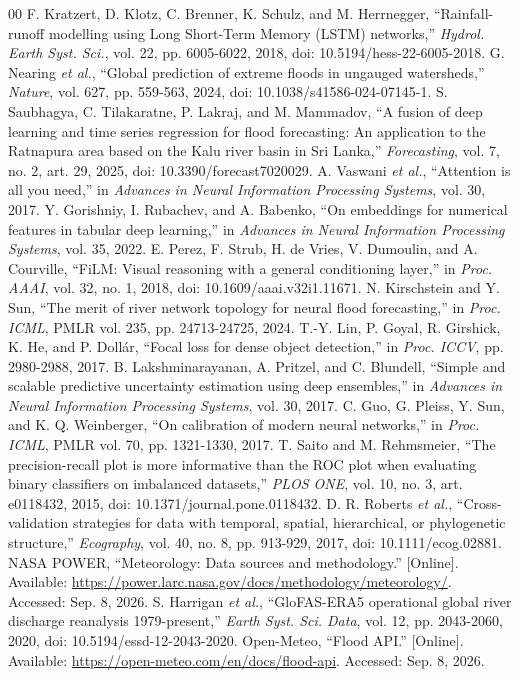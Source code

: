 \documentclass[conference]{IEEEtran}
\begin{document}
\balance
\begin{thebibliography}{00}
 F. Kratzert, D. Klotz, C. Brenner, K. Schulz, and
M. Herrnegger, ``Rainfall-runoff modelling using Long Short-Term Memory (LSTM)
networks,'' \emph{Hydrol. Earth Syst. Sci.}, vol. 22, pp. 6005-6022, 2018,
doi: 10.5194/hess-22-6005-2018.
 G. Nearing \emph{et al.}, ``Global prediction of extreme
floods in ungauged watersheds,'' \emph{Nature}, vol. 627, pp. 559-563, 2024,
doi: 10.1038/s41586-024-07145-1.
 S. Saubhagya, C. Tilakaratne, P. Lakraj, and
M. Mammadov, ``A fusion of deep learning and time series regression for flood
forecasting: An application to the Ratnapura area based on the Kalu river basin
in Sri Lanka,'' \emph{Forecasting}, vol. 7, no. 2, art. 29, 2025,
doi: 10.3390/forecast7020029.
 A. Vaswani \emph{et al.}, ``Attention is all you need,''
in \emph{Advances in Neural Information Processing Systems}, vol. 30, 2017.
 Y. Gorishniy, I. Rubachev, and A. Babenko, ``On
embeddings for numerical features in tabular deep learning,'' in
\emph{Advances in Neural Information Processing Systems}, vol. 35, 2022.
 E. Perez, F. Strub, H. de Vries, V. Dumoulin, and
A. Courville, ``FiLM: Visual reasoning with a general conditioning layer,''
in \emph{Proc. AAAI}, vol. 32, no. 1, 2018,
doi: 10.1609/aaai.v32i1.11671.
 N. Kirschstein and Y. Sun, ``The merit of river
network topology for neural flood forecasting,'' in \emph{Proc. ICML},
PMLR vol. 235, pp. 24713-24725, 2024.
 T.-Y. Lin, P. Goyal, R. Girshick, K. He, and P. Doll\'{a}r,
``Focal loss for dense object detection,'' in \emph{Proc. ICCV},
pp. 2980-2988, 2017.
 B. Lakshminarayanan, A. Pritzel, and C. Blundell,
``Simple and scalable predictive uncertainty estimation using deep ensembles,''
in \emph{Advances in Neural Information Processing Systems}, vol. 30, 2017.
 C. Guo, G. Pleiss, Y. Sun, and K. Q. Weinberger,
``On calibration of modern neural networks,'' in \emph{Proc. ICML},
PMLR vol. 70, pp. 1321-1330, 2017.
 T. Saito and M. Rehmsmeier, ``The precision-recall plot is
more informative than the ROC plot when evaluating binary classifiers on
imbalanced datasets,'' \emph{PLOS ONE}, vol. 10, no. 3, art. e0118432, 2015,
doi: 10.1371/journal.pone.0118432.
 D. R. Roberts \emph{et al.}, ``Cross-validation strategies
for data with temporal, spatial, hierarchical, or phylogenetic structure,''
\emph{Ecography}, vol. 40, no. 8, pp. 913-929, 2017,
doi: 10.1111/ecog.02881.
 NASA POWER, ``Meteorology: Data sources and methodology.''
[Online]. Available: \url{https://power.larc.nasa.gov/docs/methodology/meteorology/}.
Accessed: Sep. 8, 2026.
 S. Harrigan \emph{et al.}, ``GloFAS-ERA5 operational
global river discharge reanalysis 1979-present,'' \emph{Earth Syst. Sci. Data},
vol. 12, pp. 2043-2060, 2020, doi: 10.5194/essd-12-2043-2020.
 Open-Meteo, ``Flood API.'' [Online]. Available:
\url{https://open-meteo.com/en/docs/flood-api}. Accessed: Sep. 8, 2026.
\end{thebibliography}
\end{document}
